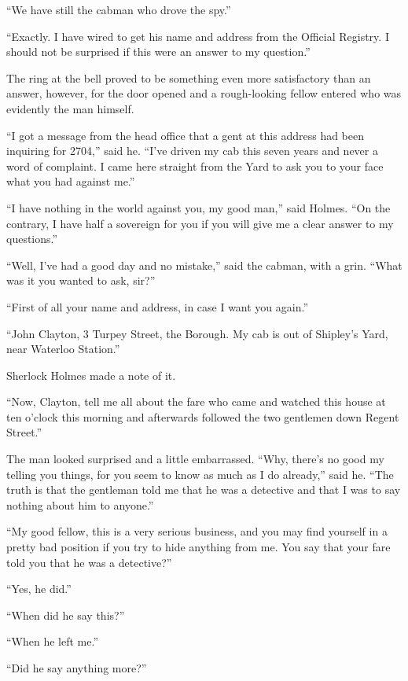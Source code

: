 \documentclass[paper=5.5in:8.5in,BCOR=7mm,twoside,DIV=calc,12pt,usegeometry,openany,chapterprefix,endperiod]{scrbook} %
\begin{document}
\enquote{We have still the cabman who drove the spy.}

\enquote{Exactly. I have wired to get his name and address from the Official Registry. I should not be surprised if this were an answer to my question.}

The ring at the bell proved to be something even more satisfactory than an answer, however, for the door opened and a rough-looking fellow entered who was evidently the man himself.

\enquote{I got a message from the head office that a gent at this address had been inquiring for 2704,} said he. \enquote{I've driven my cab this seven years and never a word of complaint. I came here straight from the Yard to ask you to your face what you had against me.}

\enquote{I have nothing in the world against you, my good man,} said Holmes. \enquote{On the contrary, I have half a sovereign for you if you will give me a clear answer to my questions.}

\enquote{Well, I've had a good day and no mistake,} said the cabman, with a grin. \enquote{What was it you wanted to ask, sir?}

\enquote{First of all your name and address, in case I want you again.}

\enquote{John Clayton, 3 Turpey Street, the Borough. My cab is out of Shipley's Yard, near Waterloo Station.}

Sherlock Holmes made a note of it.

\enquote{Now, Clayton, tell me all about the fare who came and watched this house at ten o'clock this morning and afterwards followed the two gentlemen down Regent Street.}

The man looked surprised and a little embarrassed. \enquote{Why, there's no good my telling you things, for you seem to know as much as I do already,} said he. \enquote{The truth is that the gentleman told me that he was a detective and that I was to say nothing about him to anyone.}

\enquote{My good fellow, this is a very serious business, and you may find yourself in a pretty bad position if you try to hide anything from me. You say that your fare told you that he was a detective?}

\enquote{Yes, he did.}

\enquote{When did he say this?}

\enquote{When he left me.}

\enquote{Did he say anything more?}
\end{document}
